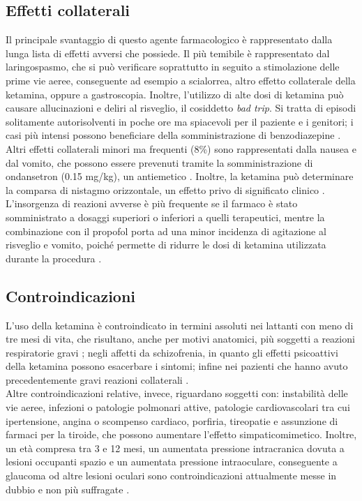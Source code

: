 \subsection*{Effetti collaterali}

Il principale svantaggio di questo agente farmacologico è rappresentato dalla lunga lista di effetti avversi che possiede. Il più temibile è rappresentato dal laringospasmo, che si può verificare soprattutto in seguito a stimolazione delle prime vie aeree, conseguente ad esempio a scialorrea, altro effetto collaterale della ketamina, oppure a gastroscopia. Inoltre, l'utilizzo di alte dosi di ketamina può causare allucinazioni e deliri al risveglio, il cosiddetto \emph{bad trip}. Si tratta di episodi solitamente autorisolventi in poche ore ma spiacevoli per il paziente e i genitori; i casi più intensi possono beneficiare della somministrazione di benzodiazepine \cite{Simeupsedazione}. Altri effetti collaterali minori ma frequenti (8\%) sono rappresentati dalla nausea e dal vomito, che possono essere prevenuti tramite la somministrazione di ondansetron (0.15 mg/kg), un antiemetico \cite{Uptodatepharmacology}. Inoltre, la ketamina può determinare la comparsa di nistagmo orizzontale, un effetto privo di significato clinico \cite{Simeupsedazione}. 
\\L'insorgenza di reazioni avverse è più frequente se il farmaco è stato somministrato a dosaggi superiori o inferiori a quelli terapeutici, mentre la combinazione con il propofol porta ad una minor incidenza di agitazione al risveglio e vomito, poiché permette di ridurre le dosi di ketamina utilizzata durante la procedura \cite{Simeupsedazione, Shah2011}. 

\subsection*{Controindicazioni}

L'uso della ketamina è controindicato in termini assoluti nei lattanti con meno di tre mesi di vita, che risultano, anche per motivi anatomici, più soggetti a reazioni respiratorie gravi \cite{Zanos2018}; negli affetti da schizofrenia, in quanto gli effetti psicoattivi della ketamina possono esacerbare i sintomi; infine nei pazienti che hanno avuto precedentemente gravi reazioni collaterali \cite{Uptodatepharmacology}.
\\Altre controindicazioni relative, invece, riguardano soggetti con: instabilità delle vie aeree, infezioni o patologie polmonari attive, patologie cardiovascolari tra cui ipertensione, angina o scompenso cardiaco, porfiria, tireopatie e assunzione di farmaci per la tiroide, che possono aumentare l'effetto simpaticomimetico. Inoltre, un età compresa tra 3 e 12 mesi, un aumentata pressione intracranica dovuta a lesioni occupanti spazio e un aumentata pressione intraoculare, conseguente a glaucoma od altre lesioni oculari sono controindicazioni attualmente messe in dubbio e non più suffragate \cite{Green2011, Simeupsedazione}.   


